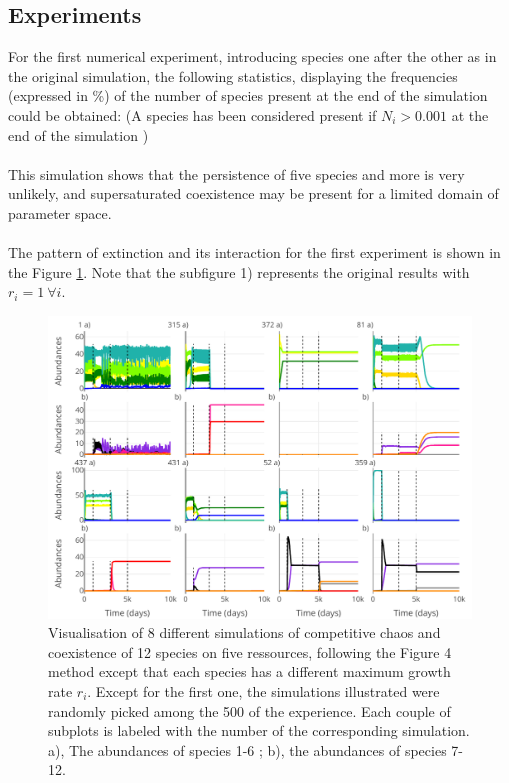 \subsection{Experiments}
For the first numerical experiment, introducing species one after the other as in the 
original simulation, the following statistics, displaying the frequencies 
(expressed in \%) of the number of species present at the end of the simulation 
could be obtained: (A species has been considered present if $N_i > 0.001$ at 
the end of the simulation )\\


\\
This simulation shows that the persistence of five species and more is 
very unlikely, and supersaturated coexistence may be present for a limited domain of parameter space.\\
\\
The pattern of extinction and its interaction for the first experiment is shown in the Figure \ref{figures:Figexp1}. Note that 
the subfigure 1) represents the original results with $r_i=1 ~\forall i$. 
\begin{figure}[H]
\begin{center} 
 \includegraphics[width=1\textwidth]{../Code/Figures/Figure_exp1.pdf}
  \caption{Visualisation of 8 different simulations of competitive chaos and 
coexistence of 12 species on five ressources, following the Figure 4 method 
except that each species has a different maximum growth rate $r_i$. Except for the first one, the simulations illustrated were randomly picked among the 500 of the experience. Each couple of subplots is labeled with the number of the corresponding simulation.
a), The abundances of species 1-6 ; b), the abundances of species 7-12.}
  \label{figures:Figexp1}
\end{center}
\end{figure}
